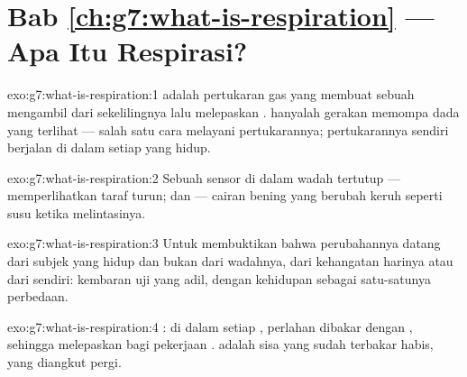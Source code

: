 \section*{Bab \ref{ch:g7:what-is-respiration} --- Apa Itu Respirasi?}

\begin{solution}{exo:g7:what-is-respiration:1}
 adalah pertukaran gas yang membuat sebuah 
mengambil  dari sekelilingnya lalu melepaskan .
 hanyalah gerakan memompa dada yang terlihat --- salah satu
cara melayani pertukarannya; pertukarannya sendiri berjalan di dalam
setiap  yang hidup.
\end{solution}

\begin{solution}{exo:g7:what-is-respiration:2}
Sebuah sensor  di dalam wadah tertutup --- memperlihatkan taraf
 turun; dan  --- cairan bening yang berubah keruh
seperti susu ketika  melintasinya.
\end{solution}

\begin{solution}{exo:g7:what-is-respiration:3}
Untuk membuktikan bahwa perubahannya datang dari subjek yang hidup dan
bukan dari wadahnya, dari kehangatan harinya atau dari 
sendiri: kembaran uji yang adil, dengan kehidupan sebagai satu-satunya
perbedaan.
\end{solution}

\begin{solution}{exo:g7:what-is-respiration:4}
: di dalam setiap ,  perlahan dibakar dengan
, sehingga melepaskan  bagi pekerjaan .
 adalah sisa yang sudah terbakar habis, yang diangkut
pergi.
\end{solution}

